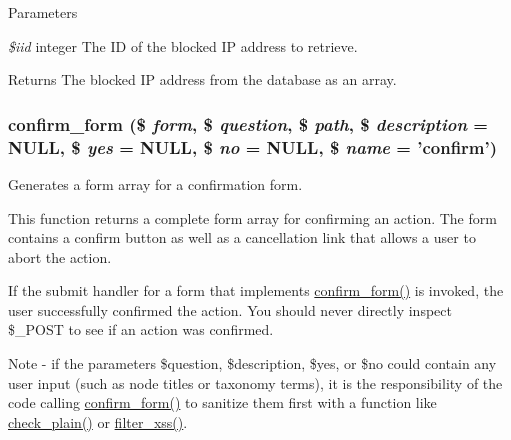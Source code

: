 \begin{DoxyParams}{Parameters}
\item[{\em \$iid}]integer The ID of the blocked IP address to retrieve.\end{DoxyParams}
\begin{DoxyReturn}{Returns}
The blocked IP address from the database as an array. 
\end{DoxyReturn}
\hypertarget{system_8module_a5457fea1ad5cf2e3767f3fc6e36b768b}{
\subsubsection[{confirm\_\-form}]{\setlength{\rightskip}{0pt plus 5cm}confirm\_\-form (\$ {\em form}, \/  \$ {\em question}, \/  \$ {\em path}, \/  \$ {\em description} = {\ttfamily NULL}, \/  \$ {\em yes} = {\ttfamily NULL}, \/  \$ {\em no} = {\ttfamily NULL}, \/  \$ {\em name} = {\ttfamily 'confirm'})}}
\label{system_8module_a5457fea1ad5cf2e3767f3fc6e36b768b}
Generates a form array for a confirmation form.

This function returns a complete form array for confirming an action. The form contains a confirm button as well as a cancellation link that allows a user to abort the action.

If the submit handler for a form that implements \hyperlink{system_8module_a5457fea1ad5cf2e3767f3fc6e36b768b}{confirm\_\-form()} is invoked, the user successfully confirmed the action. You should never directly inspect \$\_\-POST to see if an action was confirmed.

Note -\/ if the parameters \$question, \$description, \$yes, or \$no could contain any user input (such as node titles or taxonomy terms), it is the responsibility of the code calling \hyperlink{system_8module_a5457fea1ad5cf2e3767f3fc6e36b768b}{confirm\_\-form()} to sanitize them first with a function like \hyperlink{group__sanitization_ga76fc67a30fd8d75ddd80565e6e65a13d}{check\_\-plain()} or \hyperlink{group__sanitization_ga8864a29ffa8de5c9f8dc9e417060660d}{filter\_\-xss()}.


